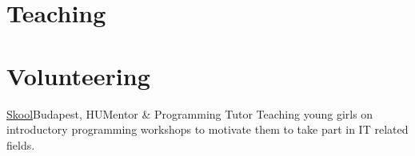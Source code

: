 \documentclass[11pt,a4paper,sans]{moderncv}        %
\newcommand{\weblink}[2]{{\href{#1}{#2}}}
\begin{document}

\section{\faBook{} Teaching}

\section{\faHandshake{} Volunteering}
%
%
{\weblink{https://skool.org.hu/}{Skool}}{Budapest, HU}{Mentor \& Programming Tutor}{}%
{Teaching young girls on introductory programming workshops to motivate them to take part in IT related fields.}
%
\end{document}
